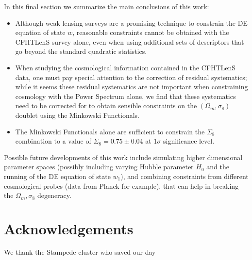 \documentclass[reprint,aps,prd,superscriptaddress,showkeys,showpacs]{revtex4-1}
\begin{document}
In this final section we summarize the main conclusions of this work:
\begin{itemize}
\item Although weak lensing surveys are a promising technique to constrain the DE equation of state $w$, reasonable constraints cannot be obtained with the CFHTLenS survey alone, even when using additional sets of descriptors that go beyond the standard quadratic statistics.
\item When studying the cosmological information contained in the CFHTLenS data, one must pay special attention to the correction of residual systematics; while it seems these residual systematics are not important when constraining cosmology with the Power Spectrum alone, we find that these systematics need to be corrected for to obtain sensible constraints on the $(\Omega_m,\sigma_8)$ doublet using the Minkowski Functionals. 
\item The Minkowski Functionals alone are sufficient to constrain the $\Sigma_8$ combination to a value of $\Sigma_8=0.75\pm0.04$ at $1\sigma$ significance level. 
\end{itemize}

Possible future developments of this work include simulating higher dimensional parameter spaces (possibly including varying Hubble parameter $H_0$ and the running of the DE equation of state $w_1$), and combining constraints from different cosmological probes (data from Planck for example), that can help in breaking the $\Omega_m,\sigma_8$ degeneracy. 

 

\section*{Acknowledgements}
We thank the Stampede cluster who saved our day


\label{lastpage}
\end{document}
